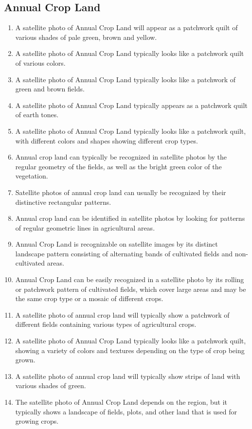 \documentclass[11pt]{article}
\begin{document}
\subsection{Annual Crop Land}
\begin{enumerate}
\item A satellite photo of Annual Crop Land will appear as a patchwork quilt of various shades of pale green, brown and yellow.
\item A satellite photo of Annual Crop Land typically looks like a patchwork quilt of various colors.
\item A satellite photo of Annual Crop Land typically looks like a patchwork of green and brown fields.
\item A satellite photo of Annual Crop Land typically appears as a patchwork quilt of earth tones.
\item A satellite photo of Annual Crop Land typically looks like a patchwork quilt, with different colors and shapes showing different crop types.
\item Annual crop land can typically be recognized in satellite photos by the regular geometry of the fields, as well as the bright green color of the vegetation.
\item Satellite photos of annual crop land can usually be recognized by their distinctive rectangular patterns.
\item Annual crop land can be identified in satellite photos by looking for patterns of regular geometric lines in agricultural areas.
\item Annual Crop Land is recognizable on satellite images by its distinct landscape pattern consisting of alternating bands of cultivated fields and non-cultivated areas.
\item Annual Crop Land can be easily recognized in a satellite photo by its rolling or patchwork pattern of cultivated fields, which cover large areas and may be the same crop type or a mosaic of different crops.
\item A satellite photo of annual crop land will typically show a patchwork of different fields containing various types of agricultural crops.
\item A satellite photo of Annual Crop Land typically looks like a patchwork quilt, showing a variety of colors and textures depending on the type of crop being grown.
\item A satellite photo of annual crop land will typically show strips of land with various shades of green.
\item The satellite photo of Annual Crop Land depends on the region, but it typically shows a landscape of fields, plots, and other land that is used for growing crops.

\end{enumerate}
\end{document}
